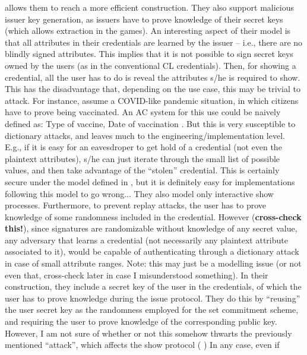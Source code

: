 \begin{enumerate}
  allows them to reach a more efficient construction. They also support malicious
  issuer key generation, as issuers have to prove knowledge of their secret keys
  (which allows extraction in the games).
  An interesting aspect of their model is that all attributes in their
  credentials are learned by the issuer -- i.e., there are no blindly signed
  attributes. This implies that it is not possible to sign secret keys owned
  by the users (as in the conventional CL credentials). Then, for showing a
  credential, all the user has to do is reveal the attributes s/he is required
  to show. This has the disadvantage that, depending on the use case, this may
  be trivial to attack. For instance, assume a COVID-like pandemic situation,
  in which citizens have to prove being vaccinated. An AC system for this use
  could be naively defined as: { Type of vaccine, Date of vaccination }. But
  this is very susceptible to dictionary attacks, and leaves much to the
  engineering/implementation level. E.g., if it is easy for an eavesdroper
  to get hold of a credential (not even the plaintext attributes), s/he can
  just iterate through the small list of possible values, and then take
  advantage of the ``stolen'' credential. This is certainly secure under the
  model defined in \cite{fhs19}, but it is definitely easy for implementations
  following this model to go wrong...
  They also model only interactive show processes. Furthermore, to prevent
  replay attacks, the user has to prove knowledge of some randomness included
  in the credential. However (\textbf{cross-check this!}), since signatures
  are randomizable without knowledge of any secret value, any adversary that
  learns a credential (not necessarily any plaintext attribute associated to
  it), would be capable of authenticating through a dictionary attack in case
  of small attribute ranges.
  Note: this may just be a modelling issue (or not even that, cross-check later
  in case I misunderstood something). In their construction, they include
  a secret key of the user in the credentials, of which the user has to prove
  knowledge during the issue protocol. They do this by ``reusing'' the user
  secret key as the randomness employed for the set commitment scheme, and
  requiring the user to prove knowledge of the corresponding public key.
  However, I am not sure of whether or not this somehow thwarts the previously
  mentioned ``attack'', which affects the show protocol ( ) In any case, even if

\end{enumerate}
